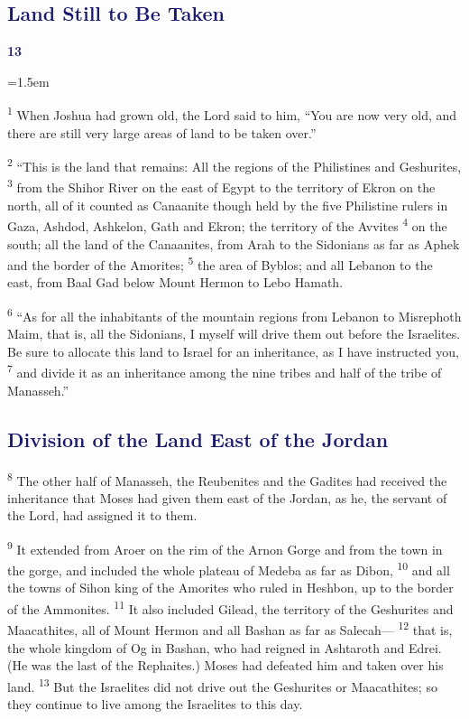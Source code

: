\documentclass[12pt,twoside]{article}
\newcommand{\vs}[1]{\textsuperscript{#1}}
\newcommand{\chapterWithBigIndent}[2]{%
  \noindent
  \begin{minipage}[t]{1cm}
    \vspace{-0.4\baselineskip}
    {\textcolor{MidnightBlue}{\fontsize{40pt}{48pt}\selectfont \textbf{#1}}}
  \end{minipage}%
  \hspace{0.9cm}%
  \begin{minipage}[t]{\dimexpr\linewidth - 1.5cm - 0.3cm\relax}
    \hangindent=1.5em
    \hangafter=3
    #2
    \vspace{0.05cm}
  \end{minipage}
}
\begin{document}
\subsection*{\textcolor{MidnightBlue}{\textbf{Land Still to Be Taken}}}

\chapterWithBigIndent{13}{
  \vs{1} When Joshua had grown old, the Lord said to him, ``You are now very old, and there are still very large areas of land to be taken over.''\vspace{0.3cm}
}
\begin{adjustwidth}{0.5cm}{0cm}
  \vs{2}  ``This is the land that remains: All the regions of the Philistines and Geshurites,
  \vs{3} from the Shihor River on the east of Egypt to the territory of Ekron on the north, all of it counted as Canaanite though held by the five Philistine rulers in Gaza, Ashdod, Ashkelon, Gath and Ekron; the territory of the Avvites
  \vs{4} on the south; all the land of the Canaanites, from Arah to the Sidonians as far as Aphek and the border of the Amorites;
  \vs{5} the area of Byblos; and all Lebanon to the east, from Baal Gad below Mount Hermon to Lebo Hamath.\vspace{0.3cm}
\end{adjustwidth}

\vs{6} ``As for all the inhabitants of the mountain regions from Lebanon to Misrephoth Maim, that is, all the Sidonians, I myself will drive them out before the Israelites. Be sure to allocate this land to Israel for an inheritance, as I have instructed you,
\vs{7} and divide it as an inheritance among the nine tribes and half of the tribe of Manasseh.''

\subsection*{{\textcolor{MidnightBlue}{\textbf{Division of the Land East of the Jordan}}}}

\vs{8} The other half of Manasseh, the Reubenites and the Gadites had received the inheritance that Moses had given them east of the Jordan, as he, the servant of the Lord, had assigned it to them.\vspace{0.3cm}

\begin{adjustwidth}{0.5cm}{0cm}
  \vs{9} It extended from Aroer on the rim of the Arnon Gorge and from the town in the gorge, and included the whole plateau of Medeba as far as Dibon,
  \vs{10} and all the towns of Sihon king of the Amorites who ruled in Heshbon, up to the border of the Ammonites.
  \vs{11} It also included Gilead, the territory of the Geshurites and Maacathites, all of Mount Hermon and all Bashan as far as Salecah---
  \vs{12} that is, the whole kingdom of Og in Bashan, who had reigned in Ashtaroth and Edrei. (He was the last of the Rephaites.) Moses had defeated him and taken over his land.
  \vs{13} But the Israelites did not drive out the Geshurites or Maacathites; so they continue to live among the Israelites to this day.\vspace{0.3cm}
\end{adjustwidth}
\end{document}
